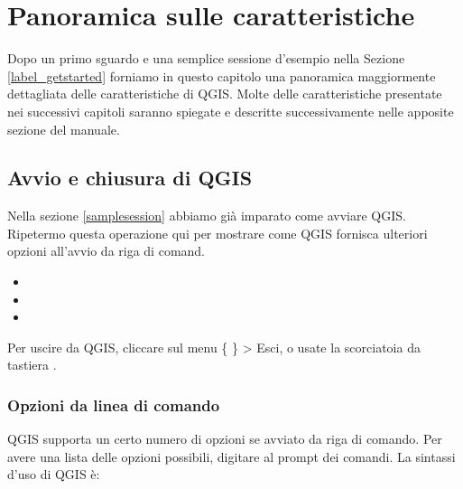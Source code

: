 
\section{Panoramica sulle caratteristiche}\label{feature_glance}


Dopo un primo sguardo e una semplice sessione d'esempio nella  Sezione \ref{label_getstarted}
forniamo in questo capitolo una panoramica maggiormente dettagliata delle caratteristiche di QGIS. 
Molte delle caratteristiche presentate nei successivi capitoli saranno spiegate
e descritte successivamente nelle apposite sezione del manuale.

\subsection{Avvio e chiusura di QGIS}\label{label_startinqgis}

Nella sezione \ref{samplesession} abbiamo già imparato come avviare QGIS. Ripetermo 
questa operazione qui per mostrare come QGIS fornisca ulteriori opzioni all'avvio da riga di comand. 

\begin{itemize}
\item {} 
\item {}
\item {}
\end{itemize} 

Per uscire da QGIS, cliccare sul menu \{\nix{} \} > Esci,
o usate la scorciatoia da tastiera .

\subsubsection{Opzioni da linea di comando}
\label{label_commandline}

\nix QGIS supporta un certo numero di opzioni se avviato da riga di comando.
Per avere una lista delle opzioni possibili, digitare  al prompt dei comandi.
La sintassi d'uso di QGIS è:

